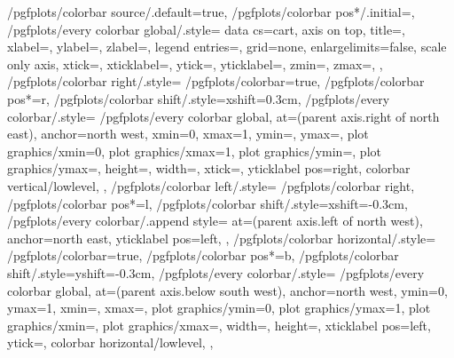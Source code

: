 {	/pgfplots/colorbar source/.default=true,
	/pgfplots/colorbar pos*/.initial=,%
	/pgfplots/every colorbar global/.style={
		data cs=cart,
		axis on top,
		title=,
		xlabel=,
		ylabel=,
		zlabel=,
		legend entries=,
		grid=none,
		enlargelimits=false,
		scale only axis,
		xtick=,
		xticklabel=,
		ytick=,
		yticklabel=,
		zmin=,
		zmax=,
	},
	/pgfplots/colorbar right/.style={%
		/pgfplots/colorbar=true,
		/pgfplots/colorbar pos*=r,
		/pgfplots/colorbar shift/.style={xshift=0.3cm},
		/pgfplots/every colorbar/.style={%
			/pgfplots/every colorbar global,
			at={(parent axis.right of north east)},
			anchor=north west,
			xmin=0,
			xmax=1,
			ymin=,
			ymax=,
			plot graphics/xmin=0,%
			plot graphics/xmax=1,
			plot graphics/ymin=,
			plot graphics/ymax=,
			height=,%
			width=,
			xtick=\empty,
			yticklabel pos=right,%
			colorbar vertical/lowlevel,
		}%
	},%
	/pgfplots/colorbar left/.style={%
		/pgfplots/colorbar right,
		/pgfplots/colorbar pos*=l,
		/pgfplots/colorbar shift/.style={xshift=-0.3cm},
		/pgfplots/every colorbar/.append style={%
			at={(parent axis.left of north west)},
			anchor=north east,
			yticklabel pos=left,%
		}%
	},%
	/pgfplots/colorbar horizontal/.style={%
		/pgfplots/colorbar=true,
		/pgfplots/colorbar pos*=b,
		/pgfplots/colorbar shift/.style={yshift=-0.3cm},
		/pgfplots/every colorbar/.style={%
			/pgfplots/every colorbar global,
			at={(parent axis.below south west)},
			anchor=north west,
			ymin=0,
			ymax=1,
			xmin=,
			xmax=,
			plot graphics/ymin=0,%
			plot graphics/ymax=1,
			plot graphics/xmin=,
			plot graphics/xmax=,
			width=,%
			height=,
			xticklabel pos=left,
			ytick=\empty,
			colorbar horizontal/lowlevel,
		}%
	},%
}
